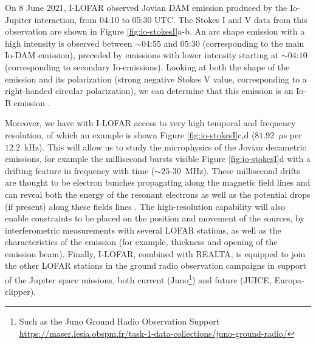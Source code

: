 
On 8 June 2021, I-LOFAR observed Jovian DAM emission produced by the Io-Jupiter interaction, from 04:10 to 05:30 UTC. The Stokes I and V data from this observation are shown in Figure \ref{fig:io-stokesI}a-b. An arc shape emission with a high intensity is observed between $\sim 04$:$55$ and $05$:$30$ (corresponding to the main Io-DAM emission), preceded by emissions with lower intensity starting at $\sim 04$:$10$ (corresponding to secondary Io-emissions). Looking at both the shape of the emission and its polarization (strong negative Stokes V value, corresponding to a right-handed circular polarization), we can determine that this emission is an Io-B emission \citep[coming from the north-dawn side of Jupiter, see][for example]{Marques2017}.

Moreover, we have with I-LOFAR access to very high temporal and frequency resolution, of which an example is shown Figure \ref{fig:io-stokesI}c,d ($81.92$~$\mu$s per $12.2$~kHz). This will allow us to study the microphysics of the Jovian decametric emissions, for example the millisecond bursts visible Figure \ref{fig:io-stokesI}d with a drifting feature in frequency with time ($\sim 25$-$30$~MHz). These millisecond drifts are thought to be electron bunches propagating along the magnetic field lines and can reveal both the energy of the resonant electrons as well as the potential drops (if present) along these fields lines \citep{Hess2007, Hess2009}. The high-resolution capability will also enable constraints to be placed on the position and movement of the sources, by interferometric measurements with several LOFAR stations, as well as the characteristics of the emission (for example, thickness and opening of the emission beam). Finally, I-LOFAR, combined with REALTA, is equipped to join the other LOFAR stations in the ground radio observation campaigns in support of the Jupiter space missions, both current (Juno\footnote{Such as the Juno Ground Radio Observation Support \hyperref[Juno]{https://maser.lesia.obspm.fr/task-1-data-collections/juno-ground-radio/}}) and future (JUICE, Europa-clipper).

